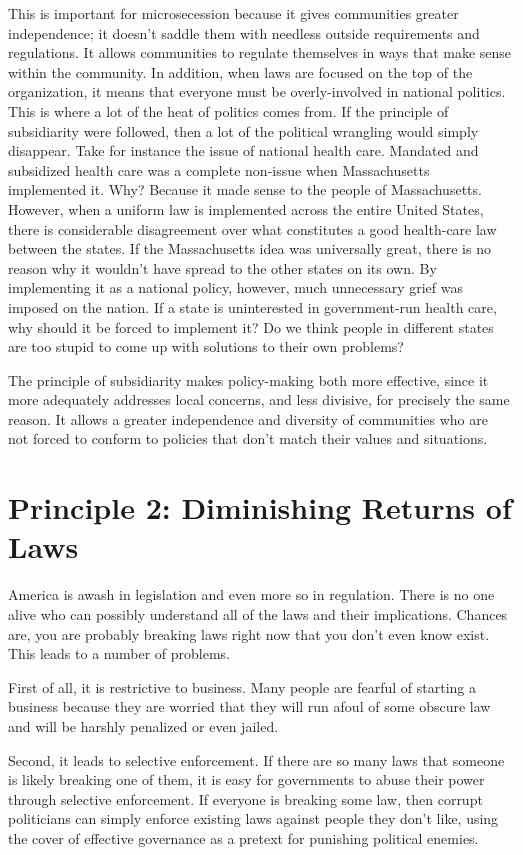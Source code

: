 This is important for microsecession because it gives communities
greater independence; it doesn't saddle them with
needless outside requirements and regulations. It allows communities to
regulate themselves in ways that make sense within the community. In
addition, when laws are focused on the top of the organization, it
means that everyone must be overly-involved in national politics. This
is where a lot of the heat of politics comes from. If the principle of
subsidiarity were followed, then a lot of the political wrangling would
simply disappear. Take for instance the issue of national health care.
Mandated and subsidized health care was a complete non-issue when
Massachusetts implemented it. Why? Because it made sense to the people
of Massachusetts. However, when a uniform law is implemented across the
entire United States, there is considerable disagreement over what
constitutes a good health-care law between the states. If the
Massachusetts idea was universally great, there is no reason why it
wouldn't have spread to the other states on its own.
By implementing it as a national policy, however, much unnecessary
grief was imposed on the nation. If a state is uninterested in
government-run health care, why should it be forced
to implement it?  Do
we think people in different states are too stupid to come up with
solutions to their own problems?

The principle of subsidiarity makes policy-making both more effective,
since it more adequately addresses local concerns, and less divisive,
for precisely the same reason. It allows a greater independence and
diversity of communities who are not forced to conform to policies that
don't match their values and situations.

\section{Principle 2: Diminishing Returns of Laws}

America is awash in legislation and even more so in regulation. There is
no one alive who can possibly understand all of the laws and their
implications. Chances are, you are probably breaking laws right now
that you don't even know exist. This leads to a number
of problems. 

First of all, it is restrictive to business. Many people are fearful of
starting a business because they are worried that they will run afoul
of some obscure law and will be harshly penalized or even jailed. 

Second, it leads to selective enforcement. If there are so many laws
that someone is likely breaking one of them, it is easy for governments
to abuse their power through selective enforcement. If everyone is
breaking some law, then corrupt politicians can simply enforce existing
laws against people they don't like,
using the cover of
effective governance as a pretext for punishing political enemies.


